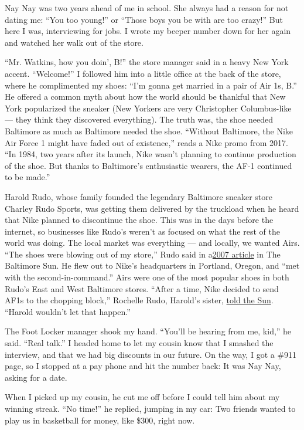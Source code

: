 Nay Nay was two years ahead of me in school. She always had a reason for
not dating me: ``You too young!'' or ``Those boys you be with are too
crazy!'' But here I was, interviewing for jobs. I wrote my beeper number
down for her again and watched her walk out of the store.

``Mr. Watkins, how you doin', B!'' the store manager said in a heavy New
York accent. ``Welcome!'' I followed him into a little office at the
back of the store, where he complimented my shoes: ``I'm gonna get
married in a pair of Air 1s, B.'' He offered a common myth about how the
world should be thankful that New York popularized the sneaker (New
Yorkers are very Christopher Columbus-like --- they think they
discovered everything). The truth was, the shoe needed Baltimore as much
as Baltimore needed the shoe. ``Without Baltimore, the Nike Air Force 1
might have faded out of existence,'' reads a Nike promo from 2017. ``In
1984, two years after its launch, Nike wasn't planning to continue
production of the shoe. But thanks to Baltimore's enthusiastic wearers,
the AF-1 continued to be made.''

Harold Rudo, whose family founded the legendary Baltimore sneaker store
Charley Rudo Sports, was getting them delivered by the truckload when he
heard that Nike planned to discontinue the shoe. This was in the days
before the internet, so businesses like Rudo's weren't as focused on
what the rest of the world was doing. The local market was everything
--- and locally, we wanted Airs. ``The shoes were blowing out of my
store,'' Rudo said in
a\href{https://www.baltimoresun.com/news/bs-xpm-2007-01-25-0701250054-story.html}{2007
article} in The Baltimore Sun. He flew out to Nike's headquarters in
Portland, Oregon, and ``met with the second-in-command.'' Airs were one
of the most popular shoes in both Rudo's East and West Baltimore stores.
``After a time, Nike decided to send AF1s to the chopping block,''
Rochelle Rudo, Harold's sister,
\href{https://www.baltimoresun.com/obituaries/bs-md-ob-harold-rudo-20170404-story.html}{told
the Sun}. ``Harold wouldn't let that happen.''

The Foot Locker manager shook my hand. ``You'll be hearing from me,
kid,'' he said. ``Real talk.'' I headed home to let my cousin know that
I smashed the interview, and that we had big discounts in our future. On
the way, I got a \#911 page, so I stopped at a pay phone and hit the
number back: It was Nay Nay, asking for a date.

When I picked up my cousin, he cut me off before I could tell him about
my winning streak. ``No time!'' he replied, jumping in my car: Two
friends wanted to play us in basketball for money, like \$300, right
now.

